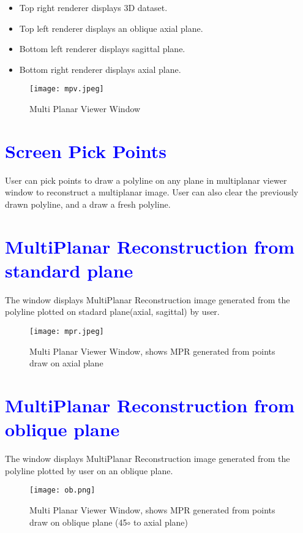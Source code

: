 \documentclass[12pt]{report}
\begin{document}
\begin{itemize}
\item Top right renderer displays 3D dataset. \\
\item Top left renderer displays an oblique axial plane. \\
\item Bottom left renderer displays sagittal plane. \\
\item Bottom right renderer displays axial plane. \\
\end{itemize}

\begin{figure}[h]
\centering
\texttt{[image: mpv.jpeg]}
\caption{Multi Planar Viewer Window}
\end{figure}


\section{\textcolor{blue}{Screen Pick Points} }
User can pick points to draw a polyline on any plane in multiplanar viewer window to reconstruct a multiplanar image. User can also clear the previously drawn polyline, and a draw a fresh polyline.

\section{\textcolor{blue}{MultiPlanar Reconstruction from standard plane} }
The window displays MultiPlanar Reconstruction image generated from the polyline plotted on stadard plane(axial, sagittal) by user. 

\begin{figure}[h]
\centering
\texttt{[image: mpr.jpeg]}
\caption{Multi Planar Viewer Window, shows MPR generated from points draw on axial plane}
\end{figure}

\section{\textcolor{blue}{MultiPlanar Reconstruction from oblique plane} }
The window displays MultiPlanar Reconstruction image generated from the polyline plotted by user on an oblique plane. 

\begin{figure}[h]
\centering
\texttt{[image: ob.png]}
\caption{Multi Planar Viewer Window, shows MPR generated from points draw on oblique plane (45$ \circ $ to axial plane)}
\end{figure}
\end{document}
